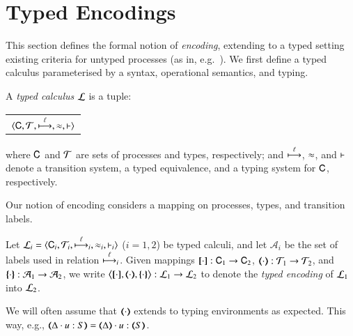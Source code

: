 
\section{Typed Encodings}
\label{s:expr}
\label{sec:enc}

This section defines the formal notion of \emph{encoding}, 
extending to a typed setting existing criteria for untyped processes (as in,
e.g.~\cite{Nestmann00,Palamidessi03,DBLP:conf/lics/PalamidessiSVV06,DBLP:journals/iandc/Gorla10,DBLP:conf/icalp/LanesePSS10}). 
We first define a typed calculus parameterised by a syntax, operational semantics, and typing.

\begin{definition}\rm
	\label{d:tcalculus}
	A \emph{typed calculus} $\mathcal{L}$ is a tuple:
	\begin{center}
		\begin{tabular}{c}
			$\langle \mathsf{C}, \cal{T}, \stackrel{\ell}{\longmapsto}, \approx, \vdash \rangle$
		\end{tabular}
	\end{center}
	\noi where $\mathsf{C}$ and $\cal{T}$ are sets of processes and types, 
	respectively; and $\stackrel{\ell}{\longmapsto}$, $\approx$, and $\vdash$ 
	denote a transition system, a typed equivalence, and a typing system for $\mathsf{C}$, respectively. 
\end{definition}

\noi Our notion of encoding considers a mapping on processes, 
types, and transition labels.  

\begin{definition}\rm
        Let  $\mathcal{L}_i=\langle \mathsf{C}_i, {\cal{T}}_i, {\stackrel{\ell}{\longmapsto}}_i, \approx_i, \vdash_i \rangle$
        ($i=1,2$) be typed calculi, and let $\mathcal{A}_i$ be the
	set of labels used in relation ${\stackrel{\ell}{\longmapsto}}_i$.
	Given mappings $[\!\![\cdot]\!\!]: \mathsf{C}_1 \to \mathsf{C}_2$, 
	$(\!\!\langle\cdot\rangle\!\!): {\cal{T}}_1 \to {\cal{T}}_2$, and 
	$\{\!\!\{\cdot\}\!\!\}: \mathcal{A}_1 \to \mathcal{A}_2$, 
	we write 
	$\enco{\map{\cdot}, \mapt{\cdot}, \mapa{\cdot}} : \tyl{L}_1 \to \tyl{L}_2$ to denote the \emph{typed encoding} of $\mathcal{L}_1$ into $\mathcal{L}_2$.
\end{definition}

\noi We will often assume that  $(\!\!\langle\cdot\rangle\!\!)$ extends to typing
environments as expected. This way, e.g., $\mapt{\Delta \cat u:S} = \mapt{\Delta} \cat u:\mapt{S}$.

